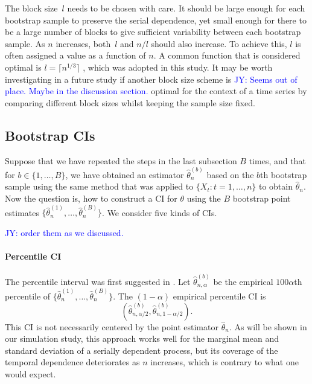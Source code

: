 \documentclass[12pt, letterpaper, titlepage]{article}
\newcommand{\jy}[1]{\textcolor{blue}{JY: #1}}
\begin{document}
The block size~$l$ needs to be chosen with care. It should be large enough for
each bootstrap sample to preserve the serial dependence, yet small enough for
there to be a large number of blocks to give sufficient variability between
each bootstrap sample. As $n$ increases, both~$l$
and $n / l$ should also increase. To achieve this, $l$ is
often assigned a value as a function of $n$. A common function that is
considered optimal is $l = \lceil n^{1/3} \rceil$
\citep{buhlmann1999block}, which was adopted in this
study. It may be worth investigating in a future study if another block size
scheme is \jy{Seems out of place. Maybe in the discussion section.}
optimal for the context of a time series by comparing different block sizes
whilst keeping the sample size fixed.


\subsection{Bootstrap CIs}

Suppose that we have repeated the steps in the last subsection $B$ times, and
that for $b \in \{1, \ldots, B\}$, we have obtained an estimator
$\hat\theta_n^{(b)}$ based on the $b$th bootstrap sample using the same method
that was applied to $\{X_t: t = 1, \ldots, n\}$ to obtain $\hat\theta_n$.
Now the question is, how to construct a CI for $\theta$
using the $B$ bootstrap point estimates
$\{\hat\theta_n^{(1)}, \ldots, \hat\theta_n^{(B)}\}$.
We consider five kinds of CIs.

\jy{order them as we discussed.}


\paragraph{Percentile CI}
The percentile interval was first suggested in \citet{efron1979bootstrap}.
Let $\hat\theta_{n, \alpha}^{(b)}$ be the empirical $100\alpha$th percentile of
$\{\hat\theta_n^{(1)}, \ldots, \hat\theta_n^{(B)}\}$. The $(1 - \alpha)$
empirical percentile CI is
\[
(\hat\theta_{n, \alpha/2}^{(b)}, \hat\theta_{n, 1 - \alpha/2}^{(b)}).
\]
This CI is not necessarily centered by the point estimator $\hat\theta_n$.
As will be shown in our simulation study, this approach works well for the
marginal mean and standard deviation of a serially dependent process, but its
coverage of the temporal dependence deteriorates as $n$ increases, which is
contrary to what one would expect.
\end{document}
